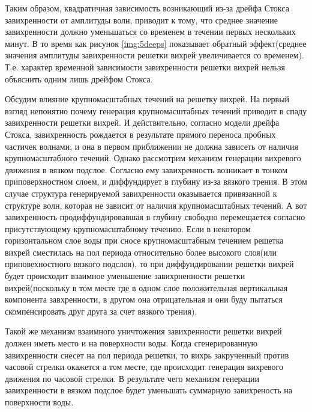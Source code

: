Таким образом, квадратичная зависимость возникающий из-за дрейфа Стокса завихренности от амплитуды волн, приводит к тому, что среднее значение завихренности должно уменьшаться со временем в течении первых нескольких минут. В то время как рисунок \ref{img:5deeps} показывает обратный эффект(среднее значения амплитуды завихренности решетки вихрей увеличивается со временем). Т.е. характер временной зависимости завихренности решетки вихрей нельзя объяснить одним лишь дрейфом Стокса. 




Обсудим влияние крупномасштабных течений на решетку вихрей.
На первый взгляд непонятно почему генерация крупномасштабных течений приводит в спаду завихренности решетки вихрей. И действительно, согласно модели дрейфа Стокса, завихренность рождается в результате прямого переноса пробных частичек волнами, и она в первом приближении не должна зависеть от наличия крупномасштабного течений. Однако рассмотрим механизм генерации вихревого движения в вязком подслое. Согласно ему завихренность возникает в тонком приповерхностном слоем, и диффундирует в глубину из-за вязкого трения. В этом случае структура генерируемой завихренности оказывается привязанной к структуре волн, которая не зависит от наличия крупномасштабных течений. А вот завихренность продиффундировавшая в глубину свободно перемещается согласно присутствующему крупномасштабному течению. Если в некотором горизонтальном слое воды при сносе крупномасштабным течением решетка вихрей сместилась на пол периода относительно более высокого слоя(или приповехностного вязкого подслоя), то при диффундировании решетки вихрей будет происходит взаимное уменьшение завихрненности решетки вихрей(поскольку в том месте где в одном слое положительная вертикальная компонента завхренности, в другом она отрицательная и они буду пытаться скомпенсировать друг друга за счет вязкого трения). 

Такой же механизм взаимного уничтожения завихренности решетки вихрей должен иметь место и на поверхности воды. Когда сгенерированную завихренности снесет на пол периода решетки, то вихрь закрученный против часовой стрелки окажется а том месте, где происходит генерация вихревого движения по часовой стрелки. В результате чего механизм генерации завихренности в вязком подслое будет уменьшать суммарную завихреность на поверхности воды.

